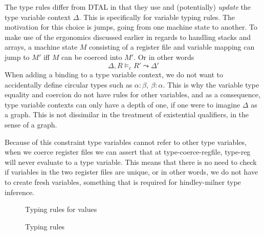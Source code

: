 The type rules differ from DTAL in that they use and (potentially) \emph{update} the type variable context $\Delta$.
This is specifically for variable typing rules.
The motivation for this choice is jumps, going from one machine state to
another.
To make use of the ergonomics discussed earlier in regards to handling stacks
and arrays, a machine state $M$ consisting of a register file and variable
mapping can jump to $M'$ iff $M$ can be coerced into $M'$.
Or in other words
\begin{equation*}
    \Delta, R \models_c R' \leadsto \Delta'
\end{equation*}
When adding a binding to a type variable context, we do not want to
accidentally define circular types such as $\alpha \colon \beta,\ \beta \colon
\alpha$.
This is why the variable type equality and coercion do not have rules for other
variables, and as a consequence, type variable contexts can only have a depth
of one, if one were to imagine $\Delta$ as a graph.
This is not dissimilar in the treatment of existential qualifiers\cite{lics},
in the sense of a graph.

Because of this constraint type variables cannot refer to other type variables,
when we coerce register files we can assert that at type-coerce-regfile,
type-reg will never evaluate to a type variable. This means that there is no
need to check if variables in the two register files are unique, or in other
words, we do not have to create fresh variables, something that is required for
hindley-milner type inference\cite{pldi}.

\begin{figure}
    
    \caption{Typing rules for values}
    \label{fig:typing-rules-values}
\end{figure}

\begin{figure}
    
    \caption{Typing rules}
    \label{fig:typing-rules}
\end{figure}


